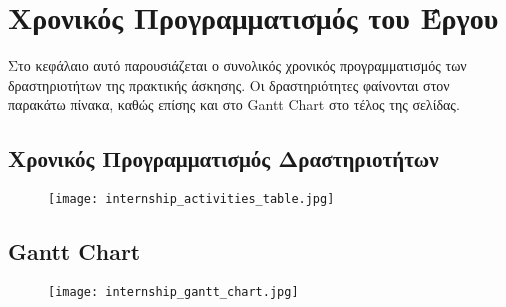 \chapter{Χρονικός Προγραμματισμός του Έργου}

Στο κεφάλαιο αυτό παρουσιάζεται ο συνολικός χρονικός προγραμματισμός των δραστηριοτήτων της πρακτικής άσκησης. Οι δραστηριότητες φαίνονται στον παρακάτω πίνακα, καθώς επίσης 
και στο Gantt Chart στο τέλος της σελίδας.\\

\section{Χρονικός Προγραμματισμός Δραστηριοτήτων}
\begin{figure}[h]
    \texttt{[image: internship\_activities\_table.jpg]}
    \centering
\end{figure}

\section{Gantt Chart}
\begin{figure}[h]
    \texttt{[image: internship\_gantt\_chart.jpg]}
    \centering
\end{figure}